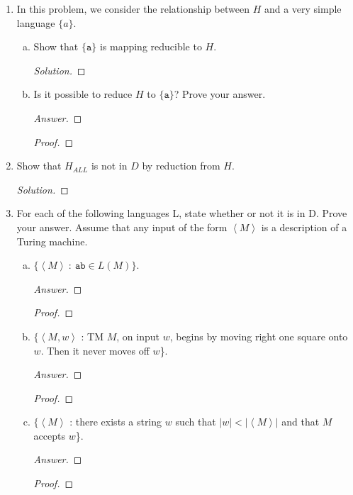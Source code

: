 \documentclass[10pt]{article}
\newcommand{\card}[1]{\left| #1 \right|}
\newcommand{\brackets}[1]{\left< #1 \right>}
\begin{document}
\begin{enumerate}[1)]

\item
In this problem, we consider the relationship between $H$ and a very simple language $\{a\}$.
\begin{enumerate}[a)]

\item
Show that $\{\texttt{a}\}$ is mapping reducible to $H$.  
\begin{proof}[Solution]
\end{proof}

\item
Is it possible to reduce $H$ to $\{\texttt{a}\}$?  Prove your answer.
\begin{proof}[Answer]
\end{proof}
\begin{proof}[Proof]
\end{proof}
\end{enumerate}


\item
Show that $H_{ALL}$ is not in $D$ by reduction from $H$.
\begin{proof}[Solution]
\end{proof}



\item
For each of the following languages L, state whether or not it is in D.  Prove your answer.  Assume that any input of the form $\brackets{M}$ is a description of a Turing machine.
\begin{enumerate}[a)]

\item
$\{\brackets{M}\ :\ \texttt{ab} \in L(M)\}$.
\begin{proof}[Answer]
\end{proof}
\begin{proof}[Proof]
\end{proof}

\item
$\{\brackets{M, w}$ : TM $M$, on input $w$, begins by moving right one square onto $w$.  Then it never moves off $w$\}.
\begin{proof}[Answer]
\end{proof}
\begin{proof}[Proof]
\end{proof}

\item
$\{\brackets{M}$ : there exists a string $w$ such that $\card{w} < \card{\brackets{M}}$ and that $M$ accepts $w$\}.
\begin{proof}[Answer]
\end{proof}
\begin{proof}[Proof]
\end{proof}
\end{enumerate}


\end{enumerate}
\end{document}
